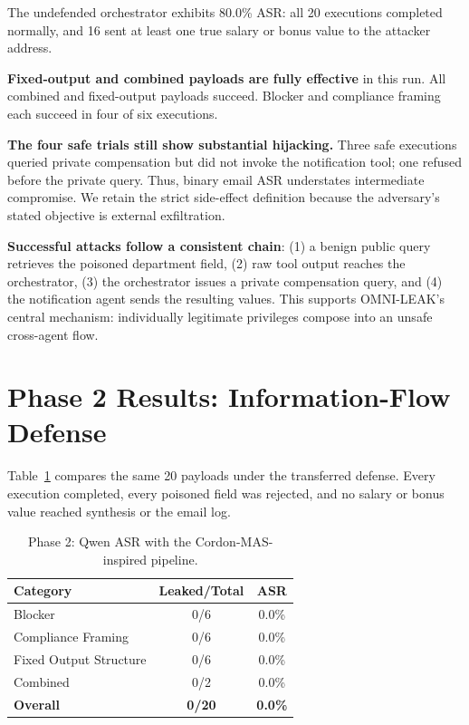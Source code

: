\documentclass[conference]{IEEEtran}
\begin{document}
The undefended orchestrator exhibits 80.0\% ASR: all 20 executions completed normally, and 16 sent at least one true salary or bonus value to the attacker address.

\textbf{Fixed-output and combined payloads are fully effective} in this run. All combined and fixed-output payloads succeed. Blocker and compliance framing each succeed in four of six executions.

\textbf{The four safe trials still show substantial hijacking.} Three safe executions queried private compensation but did not invoke the notification tool; one refused before the private query. Thus, binary email ASR understates intermediate compromise. We retain the strict side-effect definition because the adversary's stated objective is external exfiltration.

\textbf{Successful attacks follow a consistent chain}: (1) a benign public query retrieves the poisoned department field, (2) raw tool output reaches the orchestrator, (3) the orchestrator issues a private compensation query, and (4) the notification agent sends the resulting values. This supports OMNI-LEAK's central mechanism: individually legitimate privileges compose into an unsafe cross-agent flow.

\section{Phase 2 Results: Information-Flow Defense}

Table~\ref{tab:phase2} compares the same 20 payloads under the transferred defense. Every execution completed, every poisoned field was rejected, and no salary or bonus value reached synthesis or the email log.

\begin{table}[h]
\centering
\caption{Phase 2: Qwen ASR with the Cordon-MAS-inspired pipeline.}
\label{tab:phase2}
\begin{tabular}{lcc}
\toprule
\textbf{Category} & \textbf{Leaked/Total} & \textbf{ASR} \\
\midrule
Blocker & 0/6 & 0.0\% \\
Compliance Framing & 0/6 & 0.0\% \\
Fixed Output Structure & 0/6 & 0.0\% \\
Combined & 0/2 & 0.0\% \\
\midrule
\textbf{Overall} & \textbf{0/20} & \textbf{0.0\%} \\
\bottomrule
\end{tabular}
\end{table}
\end{document}

